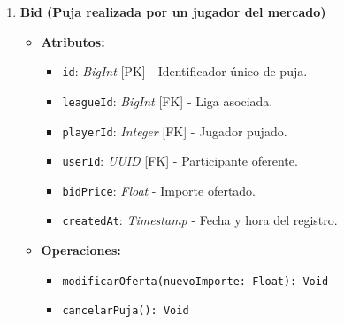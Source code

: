\begin{enumerate}
    \item \textbf{Bid (Puja realizada por un jugador del mercado)}
    \begin{itemize}
        \item \textbf{Atributos:}
            \begin{itemize}
                \item \texttt{id}: \textit{BigInt} [PK] - Identificador único de puja.
                \item \texttt{leagueId}: \textit{BigInt} [FK] - Liga asociada.
                \item \texttt{playerId}: \textit{Integer} [FK] - Jugador pujado.
                \item \texttt{userId}: \textit{UUID} [FK] - Participante oferente.
                \item \texttt{bidPrice}: \textit{Float} - Importe ofertado.
                \item \texttt{createdAt}: \textit{Timestamp} - Fecha y hora del registro.
            \end{itemize}
        \item \textbf{Operaciones:}
            \begin{itemize}
                \item \texttt{modificarOferta(nuevoImporte: Float): Void}
                \item \texttt{cancelarPuja(): Void}
            \end{itemize}
    \end{itemize}


\end{enumerate}
